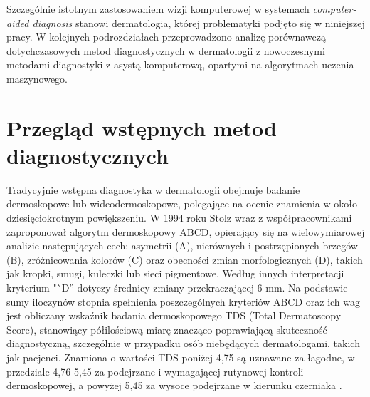 Szczególnie istotnym zastosowaniem wizji komputerowej w systemach \textit{computer-aided diagnosis} stanowi dermatologia, której problematyki podjęto się w niniejszej pracy.
W kolejnych podrozdziałach przeprowadzono analizę porównawczą dotychczasowych metod diagnostycznych w dermatologii z nowoczesnymi metodami diagnostyki z asystą komputerową, opartymi na algorytmach uczenia maszynowego.

\section{Przegląd wstępnych metod diagnostycznych}
Tradycyjnie wstępna diagnostyka w dermatologii obejmuje badanie dermoskopowe lub wideodermoskopowe, polegające na ocenie znamienia w około dziesięciokrotnym powiększeniu.
W 1994 roku Stolz wraz z współpracownikami zaproponował algorytm dermoskopowy ABCD, opierający się na wielowymiarowej analizie następujących cech: asymetrii (A), nierównych i postrzępionych brzegów (B), zróżnicowania kolorów (C) oraz obecności zmian morfologicznych (D), takich jak kropki, smugi, kuleczki lub sieci pigmentowe.
Według innych interpretacji kryterium "`D'' dotyczy średnicy zmiany przekraczającej 6 mm.
Na podstawie sumy iloczynów stopnia spełnienia poszczególnych kryteriów ABCD oraz ich wag jest obliczany wskaźnik badania dermoskopowego TDS (Total Dermatoscopy Score), stanowiący półilościową miarę znacząco poprawiającą skuteczność diagnostyczną, szczególnie w przypadku osób niebędących dermatologami, takich jak pacjenci.
Znamiona o wartości TDS poniżej 4,75 są uznawane za łagodne, w przedziale 4,76-5,45 za podejrzane i wymagającej rutynowej kontroli dermoskopowej, a powyżej 5,45 za wysoce podejrzane w kierunku czerniaka \cite{Nachbar_Stolz_Merkle_Cognetta_Vogt_Landthaler_Bilek_Braun-Falco_Plewig_1994, Wysocki_2016}.

